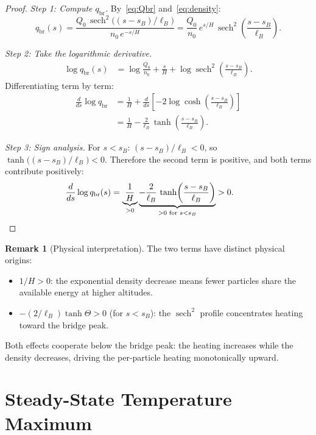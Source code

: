 \documentclass[12pt]{article}
\theoremstyle{plain}
\theoremstyle{definition}
\newtheorem{remark}[theorem]{Remark}
\numberwithin{equation}{section}
\newcommand{\br}{\mathrm{br}}
\DeclareMathOperator{\sech}{sech}
\begin{document}
\begin{proof}
\emph{Step 1: Compute $q_{\br}$.}
By~\eqref{eq:Qbr} and~\eqref{eq:density}:
\begin{equation}
q_{\br}(s) = \frac{Q_0\,\sech^2\!\bigl((s-s_B)/\ell_B\bigr)}
{n_0\,e^{-s/H}}
= \frac{Q_0}{n_0}\,e^{s/H}\,
\sech^2\!\left(\frac{s-s_B}{\ell_B}\right).
\end{equation}

\emph{Step 2: Take the logarithmic derivative.}
\begin{align}
\log q_{\br}(s) &= \log\frac{Q_0}{n_0}
+ \frac{s}{H}
+ \log\sech^2\!\left(\frac{s-s_B}{\ell_B}\right).
\end{align}
Differentiating term by term:
\begin{align}
\frac{d}{ds}\log q_{\br}
&= \frac{1}{H}
+ \frac{d}{ds}\!\left[-2\log\cosh\!\left(\frac{s-s_B}{\ell_B}\right)\right]\\
&= \frac{1}{H}
- \frac{2}{\ell_B}\,\tanh\!\left(\frac{s-s_B}{\ell_B}\right).
\end{align}

\emph{Step 3: Sign analysis.}
For $s<s_B$: $(s-s_B)/\ell_B<0$, so
$\tanh\!\bigl((s-s_B)/\ell_B\bigr)<0$.  Therefore the second term
is positive, and both terms contribute positively:
\begin{equation}
\frac{d}{ds}\log q_{\br}(s)
= \underbrace{\frac{1}{H}}_{>0}
\underbrace{- \frac{2}{\ell_B}\,\tanh\!\left(\frac{s-s_B}{\ell_B}\right)}_{>0\text{ for }s<s_B}
> 0.\qquad\qedhere
\end{equation}
\end{proof}

\begin{remark}[Physical interpretation]
The two terms have distinct physical origins:
\begin{itemize}
\item $1/H>0$: the exponential density decrease means fewer
particles share the available energy at higher altitudes.
\item $-(2/\ell_B)\tanh\Theta>0$ (for $s<s_B$): the $\sech^2$
profile concentrates heating toward the bridge peak.
\end{itemize}
Both effects cooperate below the bridge peak: the heating increases
while the density decreases, driving the per-particle heating
monotonically upward.
\end{remark}


\section{Steady-State Temperature Maximum}\label{sec:tempmax}
\end{document}

